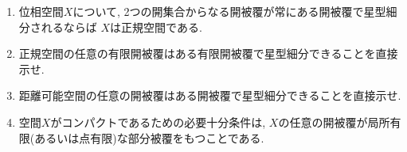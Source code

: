 \documentclass[uplatex, dvipdfmx, a4paper, 12pt, class=jsarticle, crop=false]{standalone}
\begin{document}
\renewcommand{\labelenumi}{(\alph{enumi})}
\begin{problem}[5.1.A]\label{eng-5-1-A-problem}
    \begin{enumerate}
        \item {}位相空間\(X\)について,
        2つの開集合からなる開被覆が常にある開被覆で星型細分されるならば
        \(X\)は正規空間である.

        \item 正規空間の任意の有限開被覆はある有限開被覆で星型細分できることを直接示せ.

        \item 距離可能空間の任意の開被覆はある開被覆で星型細分できることを直接示せ.

        \item \Hausdorff 空間\(X\)がコンパクトであるための必要十分条件は,
        \(X\)の任意の開被覆が局所有限(あるいは点有限)な部分被覆をもつことである.
    \end{enumerate}
\end{problem}
\end{document}
